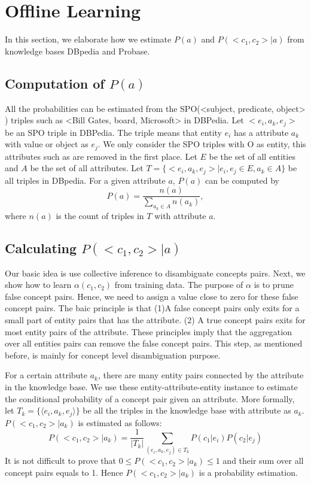 \section{Offline Learning}
In this section, we elaborate how we estimate $P(a)$ and $P(<c_{1},c_{2}>|a)$ from knowledge bases DBpedia and Probase.

\subsection{Computation of $P(a)$}
All the probabilities can be estimated from the SPO(\ac{<subject, predicate, object>} ) triples such as \ac{<Bill Gates, board, Microsoft>}  in DBPedia.
Let $<e_i, a_k, e_j>$ be an SPO triple in DBPedia.
The triple means that entity $e_i$ has a attribute $a_k$ with value or object as $e_j$.
We only consider the SPO triples with O as entity, this attributes such as  are removed in the first place.
Let $E$ be the set of all entities and $A$ be the set of all attributes.
Let $T=\{<e_i, a_k, e_j> | e_i,e_j\in E, a_k\in A\}$ be all triples in DBpedia.
For a given attribute $a$, $P(a)$ can be computed by
\begin{equation}
\label{eq:pa}
P(a)=\frac{n(a)}{\sum_{a_k\in A}{n(a_k)}},
\end{equation}
where $n(a)$ is the count of triples in $T$ with attribute $a$.


\subsection{Calculating $P(<c_{1},c_{2}>|a)$ }

Our basic idea is use collective inference to disambiguate concepts pairs.
Next, we show how to learn $\alpha(c_1,c_2)$ from training data.
The purpose of $\alpha$ is to prune false concept pairs. Hence, we need to 
assign a value close to zero for these false concept pairs. 
The baic principle is that 
(1)A false concept pairs only exits for a small part of
entity pairs that has the attribute.
(2) A true concept pairs exits for most entity pairs of the attribute.
These principles imply that the aggregation over all entities pairs can remove the false concept pairs.
This step, as mentioned before, is mainly for concept level disambiguation purpose.

For a certain attribute $a_k$, there are many entity pairs connected by the attribute in the knowledge base.
We use these entity-attribute-entity instance to estimate the conditional probability of a concept pair given an attribute.
More formally, let $T_k=\{\langle e_i, a_k, e_j \rangle\}$ be all the triples in the knowledge base with attribute as $a_k$.
$P(<c_1, c_2>|a_k)$ is estimated as follows:
\begin{equation}
P(<c_1, c_2>|a_k)= \frac{1}{|T_k|}\sum_{  (e_{i},a_k,e_{j})\in T_k } P(c_1|e_{i})P(c_2|e_{j})
\label{eq:pccga}
\end{equation}
It is not difficult to prove that $0\leq P(<c_1, c_2>|a_k)\leq 1$ and their sum over all concept pairs equals to 1.
Hence $P(<c_1, c_2>|a_k)$ is a probability estimation.

